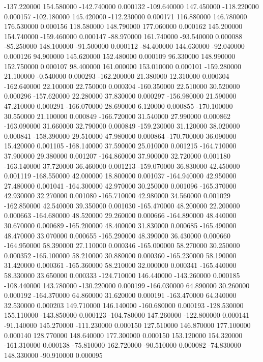 -137.220000 154.580000 -142.740000 0.000132 
-109.640000 147.450000 -118.220000 0.000157 
-102.180000 145.420000 -112.230000 0.000171 
116.880000 146.780000 176.530000 0.000156 
118.580000 148.790000 177.060000 0.000162 
145.200000 154.740000 -159.460000 0.000147 
-88.970000 161.740000 -93.540000 0.000088 
-85.250000 148.100000 -91.500000 0.000112 
-84.400000 144.630000 -92.040000 0.000126 
94.900000 145.620000 152.480000 0.000109 
96.330000 148.990000 152.750000 0.000107 
98.400000 161.000000 153.010000 0.000101 
-159.280000 21.100000 -0.540000 0.000293 
-162.200000 21.380000 12.310000 0.000304 
-162.640000 22.100000 22.750000 0.000304 
-160.350000 22.510000 30.520000 0.000296 
-157.620000 22.280000 37.830000 0.000297 
-156.980000 21.590000 47.210000 0.000291 
-166.070000 28.690000 6.120000 0.000855 
-170.100000 30.550000 21.100000 0.000849 
-166.720000 31.540000 27.990000 0.000862 
-163.090000 31.660000 32.790000 0.000849 
-159.230000 31.120000 38.020000 0.000841 
-158.390000 29.510000 47.980000 0.000864 
-170.700000 36.090000 15.420000 0.001105 
-168.140000 37.590000 25.010000 0.001215 
-164.710000 37.900000 29.380000 0.001207 
-164.860000 37.900000 32.720000 0.001180 
-163.140000 37.720000 36.460000 0.001213 
-159.070000 36.830000 42.450000 0.001119 
-168.550000 42.000000 18.800000 0.001037 
-164.940000 42.950000 27.480000 0.001041 
-164.300000 42.970000 30.250000 0.001096 
-165.370000 42.930000 32.270000 0.001080 
-165.710000 42.980000 34.560000 0.001029 
-162.850000 42.540000 39.350000 0.001030 
-165.470000 48.200000 22.200000 0.000663 
-164.680000 48.520000 29.260000 0.000666 
-164.890000 48.440000 30.670000 0.000689 
-165.200000 48.400000 31.830000 0.000685 
-165.490000 48.470000 33.070000 0.000655 
-165.290000 48.390000 36.430000 0.000660 
-164.950000 58.390000 27.110000 0.000346 
-165.000000 58.270000 30.250000 0.000352 
-165.100000 58.210000 30.880000 0.000360 
-165.230000 58.190000 31.420000 0.000361 
-165.360000 58.210000 32.000000 0.000341 
-165.440000 58.330000 33.650000 0.000333 
-124.710000 146.440000 -143.260000 0.000185 
-108.440000 143.780000 -130.220000 0.000199 
-166.030000 64.890000 30.260000 0.000192 
-164.370000 64.860000 31.620000 0.000191 
-163.470000 64.340000 32.530000 0.000203 
149.710000 146.140000 -160.680000 0.000193 
-128.530000 155.110000 -143.850000 0.000123 
-104.780000 147.260000 -122.800000 0.000141 
-91.140000 145.270000 -111.230000 0.000150 
127.510000 146.870000 177.100000 0.000140 
128.770000 148.640000 177.300000 0.000150 
153.120000 154.320000 -161.310000 0.000138 
-75.810000 162.720000 -90.510000 0.000082 
-74.830000 148.330000 -90.910000 0.000095 
